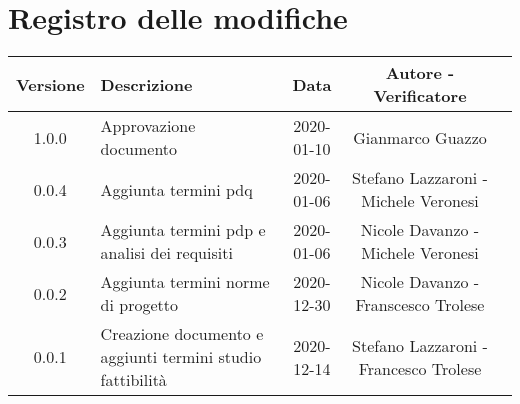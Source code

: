 \section*{Registro delle modifiche}

\begin{center}
	\begin{longtable}{|c|p{5cm}|c|c|c|}
	\hline
	\rowcolor{lighter-grayer}
	\textbf{Versione} & \textbf{Descrizione} & \textbf{Data} & \textbf{Autore - Verificatore} \\
	\hline
	\endfirsthead


	\hline
	1.0.0 & Approvazione documento & 2020-01-10 & Gianmarco Guazzo\\
	0.0.4 & Aggiunta termini pdq & 2020-01-06 & Stefano Lazzaroni - Michele Veronesi\\
	0.0.3 & Aggiunta termini pdp e analisi dei requisiti & 2020-01-06 & Nicole Davanzo - Michele Veronesi\\
	0.0.2 & Aggiunta termini norme di progetto & 2020-12-30 & Nicole Davanzo -  Franscesco Trolese\\
	0.0.1 & Creazione documento e aggiunti termini studio fattibilità & 2020-12-14 & Stefano Lazzaroni - Francesco Trolese\\
	\hline

	\end{longtable}
\end{center}